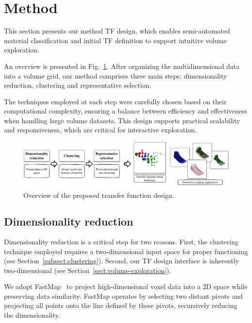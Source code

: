 \section{Method}
\label{sect:method}

This section presents our  method TF design, which enables semi-automated material classification and initial TF definition to support intuitive volume exploration.

An overview is presented in Fig.~\ref{fig:volume-exploration-pipeline}. After organizing the multidimensional data into a volume grid, our method comprises three main steps: dimensionality reduction, clustering and representative selection.

The techniques employed at each step were carefully chosen based on their computational complexity, ensuring a balance between efficiency and effectiveness when handling large volume datasets. This design supports practical scalability and responsiveness, which are critical for interactive exploration.

\begin{figure}[htb!]
    \centering
    \caption{Overview of the proposed transfer function design.}
    \label{fig:volume-exploration-pipeline}
    \includegraphics[width=\textwidth]{figs/method-overview.jpg}
\end{figure}

\subsection{Dimensionality reduction}
\label{subsect:feature-extraction}

Dimensionality reduction is a critical step for two reasons. First, the clustering technique employed requires a two-dimensional input space for proper functioning (see Section~\ref{subsect:clustering}). Second, our TF design interface is inherently two-dimensional (see Section~\ref{sect:volume-exploration}).

We adopt FastMap~\cite{faloutsos1995} to project high-dimensional voxel data into a 2D space while preserving data similarity. FastMap operates by selecting two distant pivots and projecting all points onto the line defined by these pivots, recursively reducing the dimensionality.

